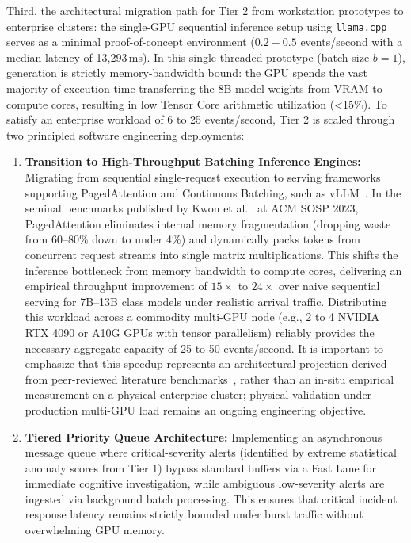 Third, the architectural migration path for Tier 2 from workstation prototypes to enterprise clusters: the single-GPU sequential inference setup using \texttt{llama.cpp} serves as a minimal proof-of-concept environment ($0.2 - 0.5$ events/second with a median latency of 13,293\,ms). In this single-threaded prototype (batch size $b=1$), generation is strictly memory-bandwidth bound: the GPU spends the vast majority of execution time transferring the 8B model weights from VRAM to compute cores, resulting in low Tensor Core arithmetic utilization (<15\%). To satisfy an enterprise workload of 6 to 25 events/second, Tier 2 is scaled through two principled software engineering deployments:
\begin{enumerate}[leftmargin=*,noitemsep]
    \item \textbf{Transition to High-Throughput Batching Inference Engines:} Migrating from sequential single-request execution to serving frameworks supporting PagedAttention and Continuous Batching, such as vLLM~\cite{kwon2023vllm}. In the seminal benchmarks published by Kwon et al.~\cite{kwon2023vllm} at ACM SOSP 2023, PagedAttention eliminates internal memory fragmentation (dropping waste from 60--80\% down to under 4\%) and dynamically packs tokens from concurrent request streams into single matrix multiplications. This shifts the inference bottleneck from memory bandwidth to compute cores, delivering an empirical throughput improvement of $15\times$ to $24\times$ over naive sequential serving for 7B--13B class models under realistic arrival traffic. Distributing this workload across a commodity multi-GPU node (e.g., 2 to 4 NVIDIA RTX 4090 or A10G GPUs with tensor parallelism) reliably provides the necessary aggregate capacity of 25 to 50 events/second. It is important to emphasize that this speedup represents an architectural projection derived from peer-reviewed literature benchmarks~\cite{kwon2023vllm}, rather than an in-situ empirical measurement on a physical enterprise cluster; physical validation under production multi-GPU load remains an ongoing engineering objective.
    \item \textbf{Tiered Priority Queue Architecture:} Implementing an asynchronous message queue where critical-severity alerts (identified by extreme statistical anomaly scores from Tier 1) bypass standard buffers via a Fast Lane for immediate cognitive investigation, while ambiguous low-severity alerts are ingested via background batch processing. This ensures that critical incident response latency remains strictly bounded under burst traffic without overwhelming GPU memory.
\end{enumerate}

